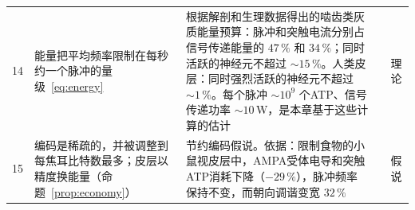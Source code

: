 {\begin{longtable}{>{\raggedright}p{0.5cm}>{\raggedright}p{4.0cm}>{\raggedright}p{5.6cm}>{\raggedright}p{2.3cm}>{\raggedright\arraybackslash}p{1.7cm}}
14 & 能量把平均频率限制在每秒约一个脉冲的量级~\eqref{eq:energy} & 根据解剖和生理数据得出的啮齿类灰质能量预算：脉冲和突触电流分别占信号传递能量的 $47\,\%$ 和 $34\,\%$；同时活跃的神经元不超过 $\sim15\,\%$。人类皮层：同时强烈活跃的神经元不超过 $\sim1\,\%$。每个脉冲 $\sim10^9$ 个ATP、信号传递功率 $\sim10$\,W，是本章基于这些计算的估计 & \cite{Attwell2001,Lennie2003} & 理论 \\
15 & 编码是稀疏的，并被调整到每焦耳比特数最多；皮层以精度换能量（命题~\ref{prop:economy}） & 节约编码假说。依据：限制食物的小鼠视皮层中，AMPA受体电导和突触ATP消耗下降（$-29\,\%$），脉冲频率保持不变，而朝向调谐变宽 $32\,\%$ & \cite{Barlow1961,Padamsey2022} & 假说 \\
\bottomrule
\end{longtable}}
